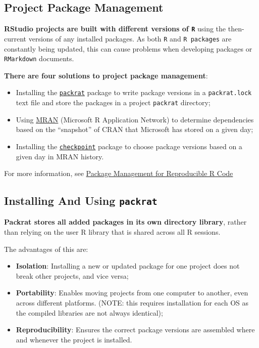 \documentclass[]{book}
\theoremstyle{definition}
\theoremstyle{definition}
\theoremstyle{definition}
\theoremstyle{remark}
\begin{document}
\hypertarget{project-package-management}{%
\subsection{Project Package
Management}\label{project-package-management}}

\textbf{RStudio projects are built with different versions of
\texttt{R}} using the then-current versions of any installed packages.
As both \texttt{R} and \texttt{R\ packages} are constantly being
updated, this can cause problems when developing packages or
\texttt{RMarkdown} documents.

\textbf{There are four solutions to project package management}:

\begin{itemize}
\item
  Installing the
  \href{https://rstudio.github.io/packrat/}{\texttt{packrat}} package to
  write package versions in a \texttt{packrat.lock} text file and store
  the packages in a project \texttt{packrat} directory;
\item
  Using \href{https://mran.microsoft.com/timemachine}{MRAN} (Microsoft R
  Application Network) to determine dependencies based on the
  ``snapshot'' of CRAN that Microsoft has stored on a given day;
\item
  Installing the
  \href{https://cran.r-project.org/web/packages/checkpoint/vignettes/checkpoint.html}{\texttt{checkpoint}}
  package to choose package versions based on a given day in MRAN
  history.
\end{itemize}

For more information, see
\href{https://rviews.rstudio.com/2018/01/18/package-management-for-reproducible-r-code/}{Package
Management for Reproducible R Code}

\hypertarget{installing-and-using-packrat}{%
\subsection{\texorpdfstring{Installing And Using
\texttt{packrat}}{Installing And Using packrat}}\label{installing-and-using-packrat}}

\textbf{Packrat stores all added packages in its own directory library},
rather than relying on the user R library that is shared across all R
sessions.

The advantages of this are:

\begin{itemize}
\item
  \textbf{Isolation}: Installing a new or updated package for one
  project does not break other projects, and vice versa;
\item
  \textbf{Portability}: Enables moving projects from one computer to
  another, even across different platforms. (NOTE: this requires
  installation for each OS as the compiled libraries are not always
  identical);
\item
  \textbf{Reproducibility}: Ensures the correct package versions are
  assembled where and whenever the project is installed.
\end{itemize}
\end{document}
